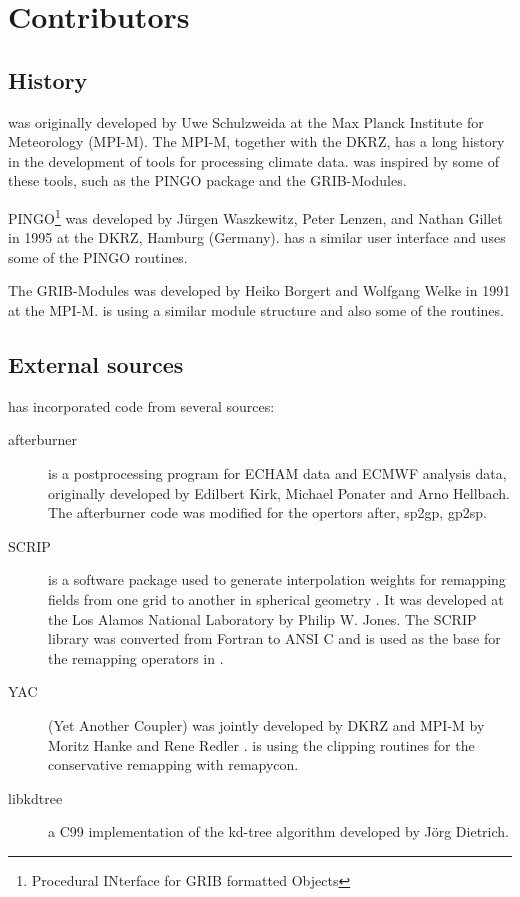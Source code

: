 \chapter{Contributors}

\section{History}

{\CDO} was originally developed by Uwe Schulzweida at the Max Planck Institute for Meteorology (MPI-M).
The MPI-M, together with the DKRZ, has a long history in the development of tools for processing climate data.
{\CDO} was inspired by some of these tools, such as the PINGO package and the GRIB-Modules.

PINGO\footnote{Procedural INterface for GRIB formatted Objects} was developed by J\"urgen Waszkewitz,
 Peter Lenzen, and Nathan Gillet in 1995 at the DKRZ, Hamburg (Germany).
{\CDO} has a similar user interface and uses some of the PINGO routines.

The GRIB-Modules was developed by Heiko Borgert and Wolfgang Welke in 1991 at the MPI-M.
{\CDO} is using a similar module structure and also some of the routines.

\section{External sources}

{\CDO} has incorporated code from several sources:

\begin{description}
\item[afterburner] is a postprocessing program for ECHAM data and ECMWF analysis data,
originally developed by Edilbert Kirk, Michael Ponater and Arno Hellbach.
The afterburner code was modified for the {\CDO} opertors after, sp2gp, gp2sp.

\item[SCRIP] is a software package used to generate interpolation weights for remapping
fields from one grid to another in spherical geometry \cite{SCRIP}.
It was developed at the Los Alamos National Laboratory by Philip W. Jones.
The SCRIP library was converted from Fortran to ANSI C and is used as
the base for the remapping operators in {\CDO}.

\item[YAC] (Yet Another Coupler) was jointly developed by DKRZ and MPI-M by Moritz Hanke and Rene Redler \cite{YAC}.
{\CDO} is using the clipping routines for the conservative remapping with remapycon.

\item[libkdtree] a C99 implementation of the kd-tree algorithm developed by J\"org Dietrich.
\end{description}

